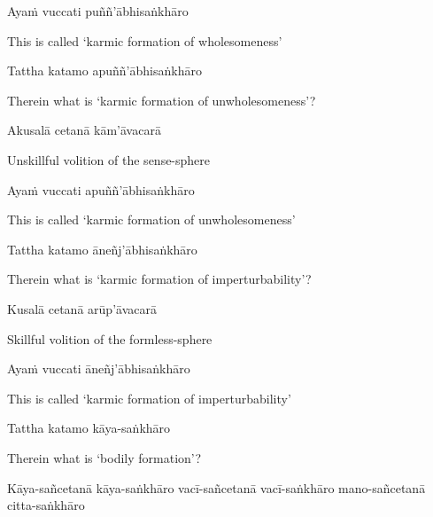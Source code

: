 Ayaṁ vuccati puññ'ābhisaṅkhāro

\begin{english}
  This is called `karmic formation of wholesomeness'
\end{english}

\ifninebythirteenversion\clearpage\fi

Tattha katamo apuññ'ābhisaṅkhāro

\begin{english}
  Therein what is `karmic formation of unwholesomeness'?
\end{english}

Akusalā cetanā kām'āvacarā

\begin{english}
  Unskillful volition of the sense-sphere
\end{english}

Ayaṁ vuccati apuññ'ābhisaṅkhāro

\begin{english}
  This is called `karmic formation of unwholesomeness'
\end{english}

Tattha katamo āneñj'ābhisaṅkhāro

\begin{english}
  Therein what is `karmic formation of imperturbability'?
\end{english}

Kusalā cetanā arūp'āvacarā

\begin{english}
  Skillful volition of the formless-sphere
\end{english}

Ayaṁ vuccati āneñj'ābhisaṅkhāro

\begin{english}
  This is called `karmic formation of imperturbability'
\end{english}

Tattha katamo kāya-saṅkhāro

\begin{english}
  Therein what is `bodily formation'?
\end{english}

\begin{pali-hang}
  Kāya-sañcetanā kāya-saṅkhāro vacī-sañcetanā vacī-saṅkhāro mano-sañcetanā citta-saṅkhāro\makeatletter\hyperlink{endnote78-appendix}\makeatother
\end{pali-hang}

